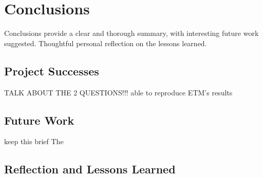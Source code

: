 \chapter{Conclusions}
Conclusions provide a clear and thorough summary, with interesting future work suggested.
Thoughtful personal reflection on the lessons learned.

\section{Project Successes}
TALK ABOUT THE 2 QUESTIONS!!!
able to reproduce ETM's results

\section{Future Work}
keep this brief
The

\section{Reflection and Lessons Learned}
